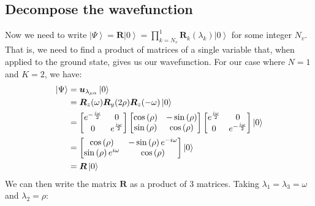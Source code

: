 \documentclass{aux/ttuthes2007}
\newcommand{\ket}[1]{\ensuremath{\left|#1\right\rangle}}
\newcommand{\s}[1]{\sin\left( #1 \right)}
\newcommand{\co}[1]{\cos\left( #1 \right)}
\newcommand{\elec}{N}
\newcommand{\orb}{K}
\newcommand{\ind}[1]{{\uo #1 \oo #1}}
\newcommand{\uo}[1]{
		\IfEqCase{#1}{
			{0}{\mu}
			{1}{\nu}
			{2}{\xi}
		}[\PackageError{uo}{Undefined option to uo: #1}{}]
}
\newcommand{\oo}[1]{
		\IfEqCase{#1}{
			{0}{\alpha}
			{1}{\beta}
			{2}{\gamma}
		}[\PackageError{unocorb}{Undefined option to unuo: #1}{}]
}
\begin{document}
\subsection {\textbf{Decompose the wavefunction}}
Now we need to write $\ket \Psi = \bm R \ket 0 = \prod_{k=N_v}^1 \bm R_k(\lambda_k) \ket 0$ for some integer $N_v$. That is, we need to find a product of matrices of a single variable that, when applied to the ground state, gives us our wavefunction.
For our case where $\elec = 1$ and $\orb = 2$, we have:
%
\begin{equation*}
\begin{split}
	\ket\Psi 
	&= \bm u_{\lambda_{\ind 0}} \ket 0 \\
	&= \bm R_z(\omega) \bm R_y(2\rho) \bm R_z(-\omega)
	\ket 0 \\
	&= 
	\begin{bmatrix}
		e^{-\frac{i\omega} 2} & 0 \\
		0 & e^{\frac{i\omega} 2}\\
	\end{bmatrix} 
	\begin{bmatrix}
		\co \rho & - \s \rho \\
		\s \rho  & \co \rho\\
	\end{bmatrix} 
	\begin{bmatrix}
		e^{\frac{i\omega} 2} & 0 \\
		0 & e^{-\frac{i\omega} 2}\\
	\end{bmatrix} 
	\ket 0 \\
	&=
	\begin{bmatrix}
		\co \rho & - \s \rho e^{-i\omega} \\
		\s \rho e^{i\omega} & \co \rho\\
	\end{bmatrix} 
	\ket 0 \\
	&= \bm R\ket 0
\end{split}
\end{equation*}
%
We can then write the matrix $\bm R$ as a product of 3 matrices. Taking $\lambda_1 = \lambda_3 = \omega$ and $\lambda_2 = \rho$:
%
\end{document}
